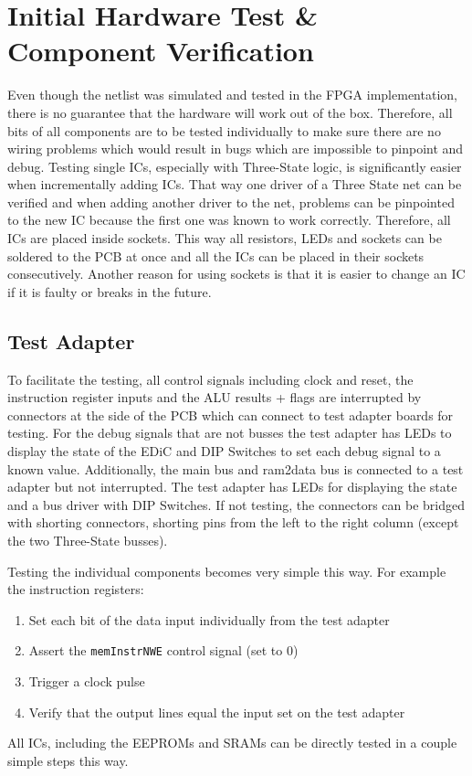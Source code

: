 \chapter{Initial Hardware Test \& Component Verification}\label{cha:eval}
Even though the netlist was simulated and tested in the \gls{FPGA} implementation, there is no guarantee that the hardware will work out of the box.
Therefore, all bits of all components are to be tested individually to make sure there are no wiring problems which would result in bugs which are impossible to pinpoint and debug.
Testing single \glspl{IC}, especially with Three-State logic, is significantly easier when incrementally adding \glspl{IC}.
That way one driver of a Three State net can be verified and when adding another driver to the net, problems can be pinpointed to the new \gls{IC} because the first one was known to work correctly.
Therefore, all \glspl{IC} are placed inside sockets.
This way all resistors, \glspl{LED} and sockets can be soldered to the \gls{PCB} at once and all the \glspl{IC} can be placed in their sockets consecutively.
Another reason for using sockets is that it is easier to change an \gls{IC} if it is faulty or breaks in the future.
\section{Test Adapter}\label{sec:testAdapter}
To facilitate the testing, all control signals including clock and reset, the instruction register inputs and the \gls{ALU} results + flags are interrupted by connectors at the side of the \gls{PCB} which can connect to test adapter boards for testing.
For the debug signals that are not busses the test adapter has \glspl{LED} to display the state of the \gls{EDiC} and DIP Switches to set each debug signal to a known value.
Additionally, the main bus and ram2data bus is connected to a test adapter but not interrupted.
The test adapter has \glspl{LED} for displaying the state and a bus driver with DIP Switches.
If not testing, the connectors can be bridged with shorting connectors, shorting pins from the left to the right column (except the two Three-State busses).

Testing the individual components becomes very simple this way.
For example the instruction registers:
\begin{enumerate}
  \item Set each bit of the data input individually from the test adapter
  \item Assert the \texttt{memInstrNWE} control signal (set to 0)
  \item Trigger a clock pulse
  \item Verify that the output lines equal the input set on the test adapter
\end{enumerate}
All \glspl{IC}, including the \glspl{EEPROM} and \glspl{SRAM} can be directly tested in a couple simple steps this way.

